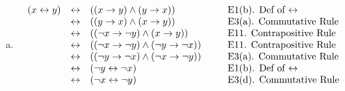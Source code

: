 \documentclass[12pt]{article}
\begin{document}
	\begin{enumerate}[(a)]
		\item
			\[
				\begin{array}{lclcl}
					(x \leftrightarrow y) & \leftrightarrow & ((x \rightarrow y) \wedge (y \rightarrow x))                     & \hspace*{.1in} & \mbox{E1(b). Def of $\leftrightarrow$} \\
					                      & \leftrightarrow & ((y \rightarrow x) \wedge (x \rightarrow y))                     &                & \mbox{E3(a). Commutative Rule}         \\
					                      & \leftrightarrow & ((\neg x \rightarrow \neg y) \wedge (x \rightarrow y))           &                & \mbox{E11. Contrapositive Rule}        \\
					                      & \leftrightarrow & ((\neg x \rightarrow \neg y) \wedge (\neg y \rightarrow \neg x)) &                & \mbox{E11. Contrapositive Rule}        \\
					                      & \leftrightarrow & ((\neg y \rightarrow \neg x) \wedge (\neg x \rightarrow \neg y)) &                & \mbox{E3(a). Commutative Rule}         \\
					                      & \leftrightarrow & (\neg y \leftrightarrow \neg x)                                  &                & \mbox{E1(b). Def of $\leftrightarrow$} \\
					                      & \leftrightarrow & (\neg x \leftrightarrow \neg y)                                  &                & \mbox{E3(d). Commutative Rule}
				\end{array}
			\]


\end{enumerate}
\end{document}
